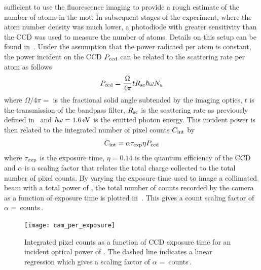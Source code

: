 sufficient to use the fluorescence imaging to provide a rough estimate of the
number of atoms in the \ac{mot}. In subsequent stages of the experiment, where
the atom number density was much lower, a photodiode with greater sensitivity
than the CCD was used to measure the number of atoms. Details on this setup can
be found in~. Under the assumption that the
power radiated per atom is constant, the power incident on the CCD
\(P_\textnormal{ccd}\) can be related to the scattering rate per atom as follows
\begin{equation}
	P_\textnormal{ccd} = \frac{\Omega}{4\pi} t R_\textnormal{sc}  \hbar \omega N_a
\end{equation}
where $\Omega/4\pi = $ is the fractional solid
angle subtended by the imaging optics, \(t\) is the transmission of the bandpass
filter, \(R_\textnormal{sc}\) is the scattering rate as previously defined
in~ and \(\hbar \omega =
\sivalue{1.6}{\electronvolt}\) is the emitted photon energy. This incident power
is then related to the integrated number of pixel counts \(C_\textnormal{int}\)
by
\begin{equation}
	C_\textnormal{int} = \alpha \tau_\textnormal{exp} \eta P_\textnormal{ccd}
\end{equation}
where \(\tau_\textnormal{exp}\) is the exposure time, \(\eta = 0.14\) is the
quantum efficiency of the CCD and \(\alpha\) is a scaling factor that relates
the total charge collected to the total number of pixel counts. By varying the
exposure time used to image a collimated beam with a total power of
, the total number of counts recorded by the camera
as a function of exposure time is plotted in~. This
gives a count scaling factor of \(\alpha\) =
\,counts\,\sivalue{}{\per\micro\second\per\micro\watt}.
\begin{figure}
	\centering
	\texttt{[image: cam\_per\_exposure]}
	\caption[Integrated pixel counts as a function of CCD exposure
		time.]{Integrated pixel counts as a function of CCD exposure time for an
		incident optical power of . The dashed line
		indicates a linear regression which gives a scaling factor of \(\alpha\)
		=
		\,counts\,\sivalue{}{\per\micro\second\per\micro\watt}.}
	\label{fig:camera_counts}
\end{figure}

